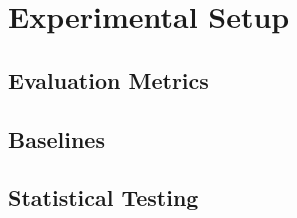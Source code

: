 \documentclass[../main.tex]{subfiles}
\begin{document}
\section{Experimental Setup}
\label{sec:method-experimental-setup}


\subsection{Evaluation Metrics}
\label{sec:experiment-metrics}

\subsection{Baselines}
\label{sec:experiment-baselines}

\subsection{Statistical Testing}
\label{sec:experiment-statistics}
\end{document}
